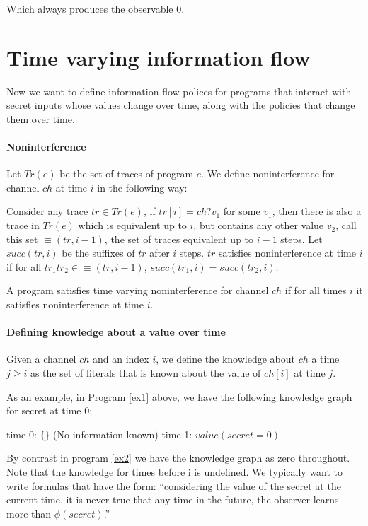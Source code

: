 \documentclass{article}
\begin{document}
Which always produces the observable 0.

\section{Time varying information flow} 

Now we want to define information flow polices for programs that
interact with secret inputs whose values change over time, along with
the policies that change them over time.

\paragraph{Noninterference}

Let $Tr(e)$ be the set of traces of program $e$.  We define
noninterference for channel $ch$ at time $i$ in the following way:

Consider any trace $tr \in Tr(e)$, if $tr[i] = ch?v_1$ for some $v_1$,
then there is also a trace in $Tr(e)$ which is equivalent up to $i$,
but contains any other value $v_2$, call this set $\equiv(tr,i-1)$,
the set of traces equivalent up to $i-1$ steps.  Let $succ(tr,i)$ be
the suffixes of $tr$ after $i$ steps.  $tr$ satisfies noninterference
at time $i$ if for all $tr_1 tr_2 \in \equiv(tr,i-1)$, $succ(tr_1,i) =
succ(tr_2,i)$.

A program satisfies time varying noninterference for channel $ch$ if
for all times $i$ it satisfies noninterference at time $i$.

\paragraph{Defining knowledge about a value over time}

Given a channel $ch$ and an index $i$, we define the knowledge about
$ch$ a time $j \geq i$ as the set of literals that is known about the
value of $ch[i]$ at time $j$.

As an example, in Program \ref{ex1} above, we have the following
knowledge graph for secret at time 0:

time 0: $\{\}$ (No information known)
time 1: $value(secret=0)$ 

By contrast in program \ref{ex2} we have the knowledge graph as zero
throughout.  Note that the knowledge for times before i is undefined.
We typically want to write formulas that have the form: ``considering
the value of the secret at the current time, it is never true that any
time in the future, the observer learns more than $\phi(secret)$.''
\end{document}
